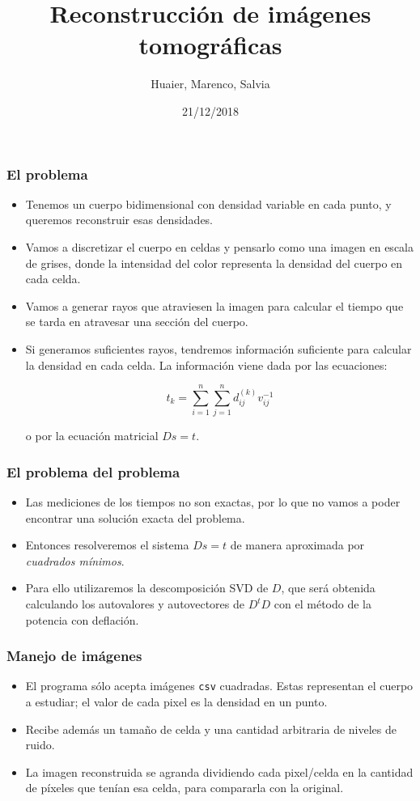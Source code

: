\documentclass{beamer}
\title{Reconstrucción de imágenes tomográficas}
\author{Huaier, Marenco, Salvia}
\date{21/12/2018}
\begin{document}
 
\frame{\titlepage}
 
\begin{frame}
\frametitle{El problema}
\begin{itemize}
\item<1->Tenemos un cuerpo bidimensional con densidad variable en cada punto, y queremos reconstruir esas densidades.

\item<2->Vamos a discretizar el cuerpo en celdas y pensarlo como una imagen en escala de grises, donde la intensidad 
del color representa la densidad del cuerpo en cada celda.

\item<3->Vamos a generar rayos que atraviesen la imagen para calcular el tiempo que se tarda en atravesar una sección del 
cuerpo.

\item<4->Si generamos suficientes rayos, tendremos información suficiente para calcular la densidad en cada celda. La información 
viene dada por las ecuaciones:

\[ t_k = \sum_{i=1}^n \sum_{j=1}^n d_{ij}^{(k)} v_{ij}^{-1} \]

\noindent o por la ecuación matricial $Ds = t$.

\end{itemize}

\end{frame}
 

\begin{frame}
\frametitle{El problema del problema}
\begin{itemize}
\item<1->Las mediciones de los tiempos no son exactas, por lo que no vamos a poder encontrar una solución exacta del problema.
\item<2->Entonces resolveremos el sistema $Ds = t$ de manera aproximada por \textit{cuadrados mínimos}.
\item<3->Para ello utilizaremos la descomposición SVD de $D$, que será obtenida calculando los autovalores y autovectores de $D^{t}D$ con 
el método de la potencia con deflación.
\end{itemize}
\end{frame}

\begin{frame}
\frametitle{Manejo de imágenes}
\begin{itemize}
\item<1-> El programa sólo acepta imágenes \texttt{csv} cuadradas. Estas representan el cuerpo a estudiar; el valor de cada pixel es 
la densidad en un punto.
\item<2-> Recibe además un tamaño de celda y una cantidad arbitraria de niveles de ruido.
\item<3-> La imagen reconstruida se agranda dividiendo cada pixel/celda en la cantidad de píxeles que tenían esa celda, para compararla con la 
original.
\end{itemize}
\end{frame}
\end{document}
